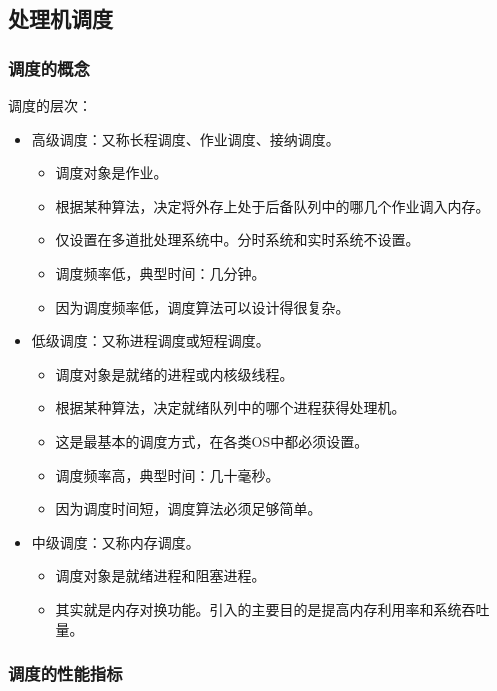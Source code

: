 \documentclass[12pt, a4paper, oneside]{ctexart}
\begin{document}
\subsection{处理机调度}

\subsubsection{调度的概念}

调度的层次：
\begin{itemize}
  \item 高级调度：又称长程调度、作业调度、接纳调度。
  \begin{itemize}
    \item 调度对象是作业。
    \item 根据某种算法，决定将外存上处于后备队列中的哪几个作业调入内存。
    \item 仅设置在多道批处理系统中。分时系统和实时系统不设置。
    \item 调度频率低，典型时间：几分钟。
    \item 因为调度频率低，调度算法可以设计得很复杂。
  \end{itemize}
  \item 低级调度：又称进程调度或短程调度。
  \begin{itemize}
    \item 调度对象是就绪的进程或内核级线程。
    \item 根据某种算法，决定就绪队列中的哪个进程获得处理机。
    \item 这是最基本的调度方式，在各类OS中都必须设置。
    \item 调度频率高，典型时间：几十毫秒。
    \item 因为调度时间短，调度算法必须足够简单。
  \end{itemize}
  \item 中级调度：又称内存调度。
  \begin{itemize}
    \item 调度对象是就绪进程和阻塞进程。
    \item 其实就是内存对换功能。引入的主要目的是提高内存利用率和系统吞吐量。
  \end{itemize}
\end{itemize}

\subsubsection{调度的性能指标}
\end{document}
